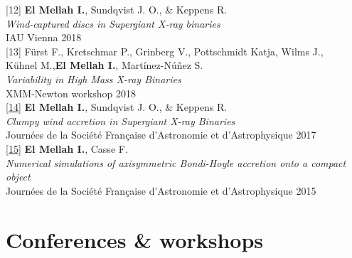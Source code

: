 \begin{flushleft}

[12] \textbf{El Mellah I.}, Sundqvist J. O., \& Keppens R. \\ 
\emph{Wind-captured discs in Supergiant X-ray binaries} \\
IAU Vienna 2018 \\
\vspace*{0.3cm}
[13] F\"{u}rst F., Kretschmar P., Grinberg V., Pottschmidt Katja, Wilms J.,\\
K\"{u}hnel M.,\textbf{El Mellah I.}, Mart\'{i}nez-N\'{u}\~{n}ez S. \\ 
\emph{Variability in High Mass X-ray Binaries} \\
XMM-Newton workshop 2018 \\
\vspace*{0.3cm}
\href{http://adsabs.harvard.edu/abs/2017sf2a.conf..145E}{[14]} \textbf{El Mellah I.}, Sundqvist J. O., \& Keppens R. \\ 
\emph{Clumpy wind accretion in Supergiant X-ray Binaries}\\
Journ\'{e}es de la Soci\'{e}t\'{e} Fran\c caise d'Astronomie et d'Astrophysique 2017\\
\vspace*{0.3cm}
\href{http://adsabs.harvard.edu/abs/2015sf2a.conf..325E}{[15]} \textbf{El Mellah I.}, Casse F. \\ 
\emph{Numerical simulations of axisymmetric Bondi-Hoyle accretion onto a compact object}\\
Journ\'{e}es de la Soci\'{e}t\'{e} Fran\c caise d'Astronomie et d'Astrophysique 2015\\

\end{flushleft}

\section*{Conferences \& workshops}

